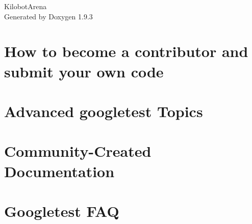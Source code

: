 \documentclass[twoside]{book}
\newcommand{\+}{\discretionary{\mbox{\scriptsize$\hookleftarrow$}}{}{}}
\newcommand{\clearemptydoublepage}{%
    \newpage{\pagestyle{empty}\cleardoublepage}%
  }
\begin{document}
  \raggedbottom
    \hypersetup{pageanchor=false,
                bookmarksnumbered=true,
                pdfencoding=unicode
               }
  \begin{titlepage}
  \vspace*{7cm}
  \begin{center}%
  {\Large Kilobot\+Arena}\\
  \vspace*{1cm}
  {\large Generated by Doxygen 1.9.3}\\
  \end{center}
  \end{titlepage}
  \clearemptydoublepage
  \tableofcontents
  \clearemptydoublepage
  \hypersetup{pageanchor=true}
\chapter{How to become a contributor and submit your own code}
\label{md___users_peterjanku__sources_cpp__kilobot_arena_external_googletest__c_o_n_t_r_i_b_u_t_i_n_g}

\chapter{Advanced googletest Topics}
\label{md___users_peterjanku__sources_cpp__kilobot_arena_external_googletest_docs_advanced}

\chapter{Community-\/\+Created Documentation}
\label{md___users_peterjanku__sources_cpp__kilobot_arena_external_googletest_docs_community_created_documentation}

\chapter{Googletest FAQ}
\label{md___users_peterjanku__sources_cpp__kilobot_arena_external_googletest_docs_faq}

\end{document}
